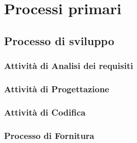 
\chapter{Processi primari}
	\section{Processo di sviluppo}
		\subsection{Attività di Analisi dei requisiti}
			
			
			
			
			
		\subsection{Attività di Progettazione}
		\subsection{Attività di Codifica}
		
	\subsection{Processo di Fornitura}
